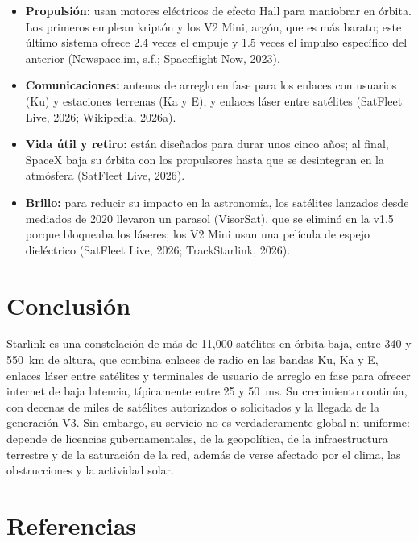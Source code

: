 \documentclass[12pt,letterpaper]{article}
\begin{document}
\begin{itemize}[nosep]
    \item \textbf{Propulsión:} usan motores eléctricos de efecto Hall para maniobrar en órbita. Los primeros emplean kriptón y los V2 Mini, argón, que es más barato; este último sistema ofrece 2.4 veces el empuje y 1.5 veces el impulso específico del anterior (Newspace.im, s.f.; Spaceflight Now, 2023).
    \item \textbf{Comunicaciones:} antenas de arreglo en fase para los enlaces con usuarios (Ku) y estaciones terrenas (Ka y E), y enlaces láser entre satélites (SatFleet Live, 2026; Wikipedia, 2026a).
    \item \textbf{Vida útil y retiro:} están diseñados para durar unos cinco años; al final, SpaceX baja su órbita con los propulsores hasta que se desintegran en la atmósfera (SatFleet Live, 2026).
    \item \textbf{Brillo:} para reducir su impacto en la astronomía, los satélites lanzados desde mediados de 2020 llevaron un parasol (VisorSat), que se eliminó en la v1.5 porque bloqueaba los láseres; los V2 Mini usan una película de espejo dieléctrico (SatFleet Live, 2026; TrackStarlink, 2026).
\end{itemize}

\section{Conclusión}

Starlink es una constelación de más de 11,000 satélites en órbita baja, entre 340 y 550~km de altura, que combina enlaces de radio en las bandas Ku, Ka y E, enlaces láser entre satélites y terminales de usuario de arreglo en fase para ofrecer internet de baja latencia, típicamente entre 25 y 50~ms. Su crecimiento continúa, con decenas de miles de satélites autorizados o solicitados y la llegada de la generación V3. Sin embargo, su servicio no es verdaderamente global ni uniforme: depende de licencias gubernamentales, de la geopolítica, de la infraestructura terrestre y de la saturación de la red, además de verse afectado por el clima, las obstrucciones y la actividad solar.

\newpage
\section*{Referencias}
\end{document}
